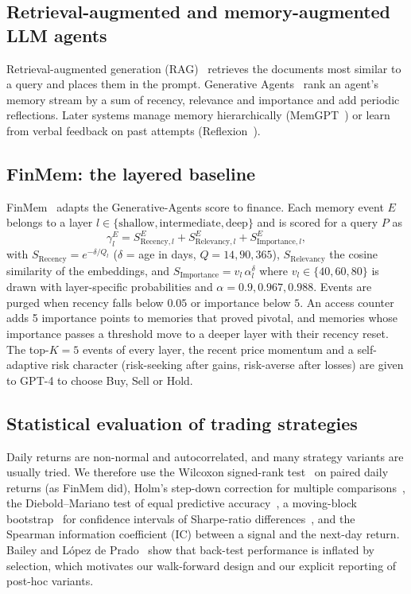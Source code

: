 \subsection{Retrieval-augmented and memory-augmented LLM agents}
Retrieval-augmented generation (RAG)~\cite{lewis2020rag} retrieves the documents most similar to a query and places them in the prompt. Generative Agents~\cite{park2023generative} rank an agent's memory stream by a sum of recency, relevance and importance and add periodic reflections. Later systems manage memory hierarchically (MemGPT~\cite{packer2023memgpt}) or learn from verbal feedback on past attempts (Reflexion~\cite{shinn2023reflexion}).

\subsection{FinMem: the layered baseline}
\label{sec:finmem-bg}
FinMem~\cite{yu2023finmem} adapts the Generative-Agents score to finance. Each memory event $E$ belongs to a layer $l\in\{\text{shallow},\text{intermediate},\text{deep}\}$ and is scored for a query $P$ as
\begin{equation}
\gamma^E_l = S^E_{\text{Recency},l} + S^E_{\text{Relevancy},l} + S^E_{\text{Importance},l},
\end{equation}
with $S_{\text{Recency}}=e^{-\delta/Q_l}$ ($\delta$ = age in days, $Q=14,90,365$), $S_{\text{Relevancy}}$ the cosine similarity of the embeddings, and $S_{\text{Importance}} = v_l\,\alpha_l^{\delta}$ where $v_l\in\{40,60,80\}$ is drawn with layer-specific probabilities and $\alpha=0.9,0.967,0.988$. Events are purged when recency falls below $0.05$ or importance below $5$. An access counter adds 5 importance points to memories that proved pivotal, and memories whose importance passes a threshold move to a deeper layer with their recency reset. The top-$K=5$ events of every layer, the recent price momentum and a self-adaptive risk character (risk-seeking after gains, risk-averse after losses) are given to GPT-4 to choose Buy, Sell or Hold.

\subsection{Statistical evaluation of trading strategies}
Daily returns are non-normal and autocorrelated, and many strategy variants are usually tried. We therefore use the Wilcoxon signed-rank test~\cite{wilcoxon1945} on paired daily returns (as FinMem did), Holm's step-down correction for multiple comparisons~\cite{holm1979}, the Diebold--Mariano test of equal predictive accuracy~\cite{diebold1995}, a moving-block bootstrap~\cite{kunsch1989} for confidence intervals of Sharpe-ratio differences~\cite{ledoit2008}, and the Spearman information coefficient (IC) between a signal and the next-day return. Bailey and L\'opez de Prado~\cite{bailey2014deflated} show that back-test performance is inflated by selection, which motivates our walk-forward design and our explicit reporting of post-hoc variants.

